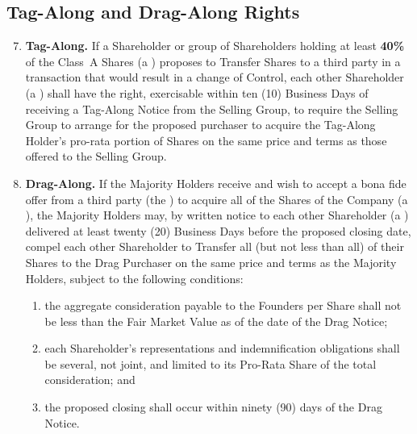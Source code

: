 \subsection{Tag-Along and Drag-Along Rights}

\begin{enumerate}[leftmargin=*, label=\textbf{6.\arabic*.}, itemsep=5pt]
  \setcounter{enumi}{6}
  \item \textbf{Tag-Along.}  If a Shareholder or group of Shareholders holding at
        least \textbf{40\%} of the Class~A Shares (a )
        proposes to Transfer Shares to a third party in a transaction that would
        result in a change of Control, each other Shareholder (a
        ) shall have the right, exercisable within ten
        (10) Business Days of receiving a Tag-Along Notice from the Selling Group,
        to require the Selling Group to arrange for the proposed purchaser to
        acquire the Tag-Along Holder's pro-rata portion of Shares on the same price
        and terms as those offered to the Selling Group.

  \item \textbf{Drag-Along.}  If the Majority Holders receive and wish to accept a
        bona fide offer from a third party (the ) to
        acquire all of the Shares of the Company (a ), the
        Majority Holders may, by written notice to each other Shareholder (a
        ) delivered at least twenty (20) Business Days before
        the proposed closing date, compel each other Shareholder to Transfer all
        (but not less than all) of their Shares to the Drag Purchaser on the same
        price and terms as the Majority Holders, subject to the following
        conditions:
        \begin{enumerate}[label=\lbrack\alph*\rbrack, leftmargin=2em, itemsep=2pt]
          \item the aggregate consideration payable to the Founders per Share shall
                not be less than the Fair Market Value as of the date of the Drag
                Notice;
          \item each Shareholder's representations and indemnification obligations
                shall be several, not joint, and limited to its Pro-Rata Share of
                the total consideration; and
          \item the proposed closing shall occur within ninety (90) days of the
                Drag Notice.
        \end{enumerate}
\end{enumerate}

